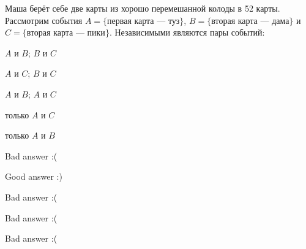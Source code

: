 
\begin{question}
Маша берёт себе две карты из хорошо перемешанной колоды в 52 карты.
Рассмотрим события \(A = \{\text{первая карта — туз}\}\),
\(B = \{\text{вторая карта — дама}\}\) и
\(C=\{\text{вторая карта — пики}\}\). Независимыми являются пары
событий:
\begin{answerlist}
  \item \(A\) и \(B\); \(B\) и \(C\)
  \item \(A\) и \(C\); \(B\) и \(C\)
  \item \(A\) и \(B\); \(A\) и \(C\)
  \item только \(A\) и \(C\)
  \item только \(A\) и \(B\)
\end{answerlist}
\end{question}

\begin{solution}
\begin{answerlist}
  \item Bad answer :(
  \item Good answer :)
  \item Bad answer :(
  \item Bad answer :(
  \item Bad answer :(
\end{answerlist}
\end{solution}


